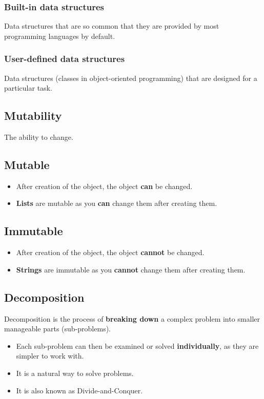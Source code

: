 \documentclass[11pt]{article}
\begin{document}
\subsubsection{Built-in data structures}
\label{sec:org53a45d6}
Data structures that are so common that they are provided by most programming languages by default.
\subsubsection{User-defined data structures}
\label{sec:org2907b83}
Data structures (classes in object-oriented programming) that are designed for a particular task.
\subsection{Mutability}
\label{sec:orge10f7e0}
The ability to change.
\subsection{Mutable}
\label{sec:org414f1f0}
\begin{itemize}
\item After creation of the object, the object \textbf{can} be changed.
\item \textbf{Lists} are mutable as you \textbf{can} change them after creating them.
\end{itemize}
\subsection{Immutable}
\label{sec:org0394b44}
\begin{itemize}
\item After creation of the object, the object \textbf{cannot} be changed.
\item \textbf{Strings} are immutable as you \textbf{cannot} change them after creating them.
\end{itemize}
\subsection{Decomposition}
\label{sec:org1acde0d}
Decomposition is the process of \textbf{breaking down} a complex problem into smaller manageable parts (sub-problems).
\begin{itemize}
\item Each sub-problem can then be examined or solved \textbf{individually}, as they are simpler to work with.
\item It is a natural way to solve problems.
\item It is also known as Divide-and-Conquer.
\end{itemize}
\end{document}
